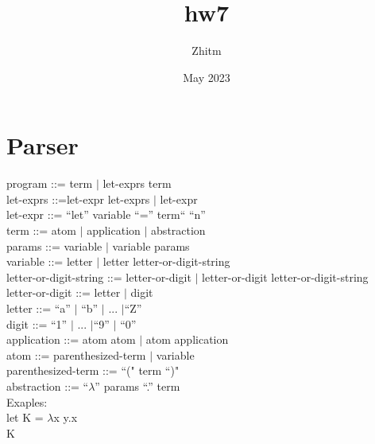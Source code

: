 \documentclass{article}
\title{hw7}
\author{Zhitm}
\date{May 2023}
\begin{document}
\maketitle

\section{Parser}


program ::= term $\vert$ let-exprs term\\
let-exprs ::=let-expr let-exprs $\vert$ let-expr\\
let-expr ::= ``let'' variable ``='' term`` ``n'' \\
term ::= atom $\vert$ application $\vert$ abstraction \\
params ::= variable $\vert$ variable params\\
variable ::= letter $\vert$ letter letter-or-digit-string\\
letter-or-digit-string ::= letter-or-digit $\vert$ letter-or-digit letter-or-digit-string\\
letter-or-digit ::= letter $\vert$ digit\\letter ::= ``a'' $\vert$ ``b'' $\vert$ ... $\vert$``Z''\\
digit ::= ``1'' $\vert$ ... $\vert$``9'' $\vert$ ``0''\\
application ::= atom atom $\vert$ atom application\\
atom ::= parenthesized-term $\vert$ variable\\
parenthesized-term ::= ``(" term ``)"\\
abstraction ::= ``$\lambda$'' params ``.'' term\\





\noindent Exaples:\\
let K = $\lambda$x y.x\\
K\\
\end{document}
